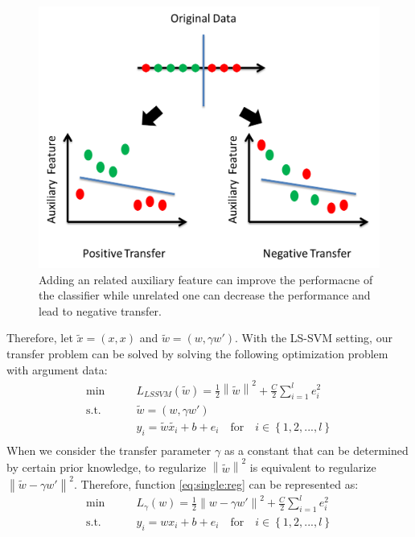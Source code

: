 \begin{figure}
	\centering
	\includegraphics[scale=.6]{transfer/fig/dataarg.png}
	\caption{Adding an related auxiliary feature can improve the performacne of the classifier while unrelated one can decrease the performance and lead to negative transfer. }\label{fig:single:dataarg}
\end{figure}

Therefore, let $\tilde{x} = (x,x)$ and $\tilde{w} = (w,\gamma w')$.
With the LS-SVM setting, our transfer problem can be solved by solving the following optimization problem with argument data:
\begin{equation}\label{eq:single:reg}
	\begin{aligned}
	\min \qquad& L_{LSSVM}(\tilde{w}) = \frac{1}{2}{\left\| \tilde{w} \right\|^2} + \frac{C}{2}\sum\limits_{i = 1}^l {{e_i ^2}}\\
	\text{s.t.}\qquad& \tilde{w} = (w,\gamma w')\\
	&{y_i} = \tilde{w} {\tilde{x_i}} + b + {e _i} \quad   \text{for} \quad i \in \left\{ {1,2,...,l} \right\}\\
	\end{aligned}
\end{equation}
When we consider the transfer parameter $\gamma$ as a constant that can be determined by certain prior knowledge, to regularize  $\left\|\tilde{w}\right\|^2$ is equivalent to regularize $\left\|\tilde{w}-\gamma w'\right\|^2$. Therefore, function \eqref{eq:single:reg} can be represented as:
\begin{equation}\label{eq:single:formreg}
\begin{aligned}
\min \qquad& L_{\gamma}(w) = \frac{1}{2}{\left\| {w}-\gamma w' \right\|^2} + \frac{C}{2}\sum\limits_{i = 1}^l {{e_i ^2}}\\
\text{s.t.}\qquad& {y_i} = {w} {{x_i}} + b + {e _i} \quad   \text{for} \quad i \in \left\{ {1,2,...,l} \right\}\\
\end{aligned}
\end{equation}

